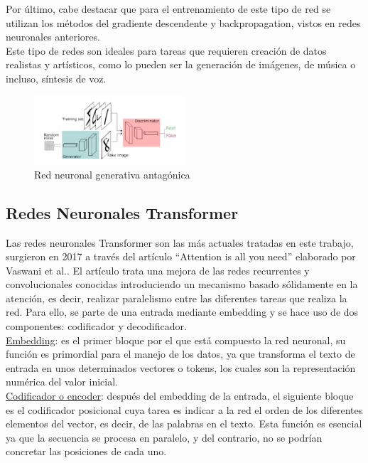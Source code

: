 Por último, cabe destacar que para el entrenamiento de este tipo de red se utilizan los métodos del gradiente descendente y backpropagation, vistos en redes neuronales anteriores. \\

Este tipo de redes son ideales para tareas que requieren creación de datos realistas y artísticos, como lo pueden ser la generación de imágenes, de música o incluso, síntesis de voz. 

\begin{figure}[h]
	\centering
	\includegraphics[width = 0.5\textwidth]{Imagenes/Vectorial/gan.png}
	\caption{Red neuronal generativa antagónica}
	\label{fig:gan}
\end{figure}


\subsection{Redes Neuronales Transformer}

Las redes neuronales Transformer son las más actuales tratadas en este trabajo, surgieron en 2017 a través del artículo “Attention is all you need” elaborado por Vaswani et al.. El artículo trata una mejora de las redes recurrentes y convolucionales conocidas introduciendo un mecanismo basado sólidamente en la atención, es decir, realizar paralelismo entre las diferentes tareas que realiza la red. Para ello, se parte de una entrada mediante embedding y se hace uso de dos componentes: codificador y decodificador. \\

\underline{Embedding}: es el primer bloque por el que está compuesto la red neuronal, su función es primordial para el manejo de los datos, ya que transforma el texto de entrada en unos determinados vectores o tokens, los cuales son la representación numérica del valor inicial. \\

\underline{Codificador o encoder}:  después del embedding de la entrada, el siguiente bloque es el codificador posicional cuya tarea es indicar a la red el orden de los diferentes elementos del vector, es decir, de las palabras en el texto. Esta función es esencial ya que la secuencia se procesa en paralelo, y del contrario, no se podrían concretar las posiciones de cada uno.\\

